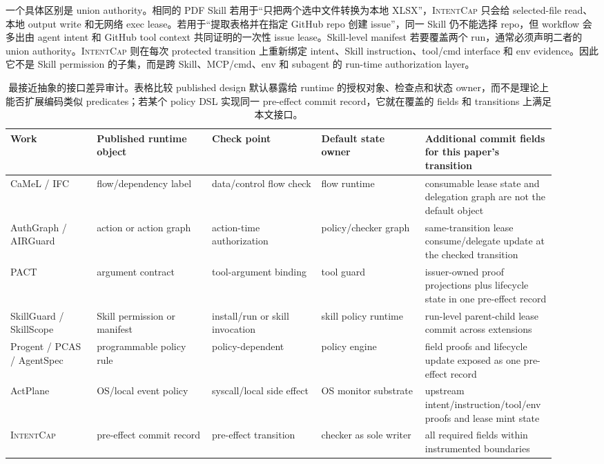 \documentclass[UTF8,a4paper,11pt]{ctexart}
\newcommand{\sys}{\textsc{IntentCap}\xspace}
\begin{document}
一个具体区别是 union authority。相同的 PDF Skill 若用于“只把两个选中文件转换为本地 XLSX”，\sys 只会给 selected-file read、本地 output write 和无网络 exec lease。若用于“提取表格并在指定 GitHub repo 创建 issue”，同一 Skill 仍不能选择 repo，但 workflow 会多出由 agent intent 和 GitHub tool context 共同证明的一次性 issue lease。Skill-level manifest 若要覆盖两个 run，通常必须声明二者的 union authority。\sys 则在每次 protected transition 上重新绑定 intent、Skill instruction、tool/cmd interface 和 env evidence。因此它不是 Skill permission 的子集，而是跨 Skill、MCP/cmd、env 和 subagent 的 run-time authorization layer。

\begin{table}[t]
\centering
\scriptsize
\setlength{\tabcolsep}{2pt}
\caption{最接近抽象的接口差异审计。表格比较 published design 默认暴露给 runtime 的授权对象、检查点和状态 owner，而不是理论上能否扩展编码类似 predicates；若某个 policy DSL 实现同一 pre-effect commit record，它就在覆盖的 fields 和 transitions 上满足本文接口。}
\label{tab:closest-abstractions}
\begin{tabular}{p{0.15\linewidth}p{0.20\linewidth}p{0.19\linewidth}p{0.18\linewidth}p{0.20\linewidth}}
\toprule
Work & Published runtime object & Check point & Default state owner & Additional commit fields for this paper's transition \\
\midrule
CaMeL / IFC & flow/dependency label & data/control flow check & flow runtime & consumable lease state and delegation graph are not the default object \\
AuthGraph / AIRGuard & action or action graph & action-time authorization & policy/checker graph & same-transition lease consume/delegate update at the checked transition \\
PACT & argument contract & tool-argument binding & tool guard & issuer-owned proof projections plus lifecycle state in one pre-effect record \\
SkillGuard / SkillScope & Skill permission or manifest & install/run or skill invocation & skill policy runtime & run-level parent-child lease commit across extensions \\
Progent / PCAS / AgentSpec & programmable policy rule & policy-dependent & policy engine & field proofs and lifecycle update exposed as one pre-effect record \\
ActPlane & OS/local event policy & syscall/local side effect & OS monitor substrate & upstream intent/instruction/tool/env proofs and lease mint state \\
\sys & pre-effect commit record & pre-effect transition & checker as sole writer & all required fields within instrumented boundaries \\
\bottomrule
\end{tabular}
\end{table}
\end{document}
